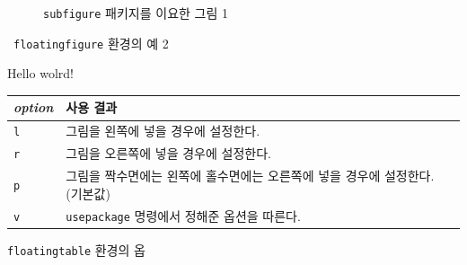 \documentclass[11pt]{article}
\begin{document}
\begin{figure}[!t]
\centerline{
 }
\caption{\texttt{subfigure} 패키지를 이요한 그림 1}
\end{figure}

\newpage
\begin{floatingfigure}[b]{80mm}
\caption{\mbox{ }\texttt{floatingfigure} 환경의 예 2}
\end{floatingfigure}

Hello wolrd!

\newpage
\clearpage
\begin{floatingtable}
{
\begin{tabular}{|l|p{2.6in}|} \hline
\textit{option} 	& 사용 결과 \\ \hline \hline
\texttt{l} 			& 그림을 왼쪽에 넣을 경우에 설정한다. \\ \hline
\texttt{r}			& 그림을 오른쪽에 넣을 경우에 설정한다. \\ \hline
\texttt{p}			& 그림을 짝수면에는 왼쪽에 홀수면에는 오른쪽에 넣을 경우에 설정한다. (기본값)\\ \hline
\texttt{v}			& \texttt{\symbol{92}usepackage} 명령에서 정해준 옵션을 따른다. \\ \hline
\end{tabular}
}
\caption{\texttt{floatingtable} 환경의 옵}
\end{floatingtable}
\end{document}
